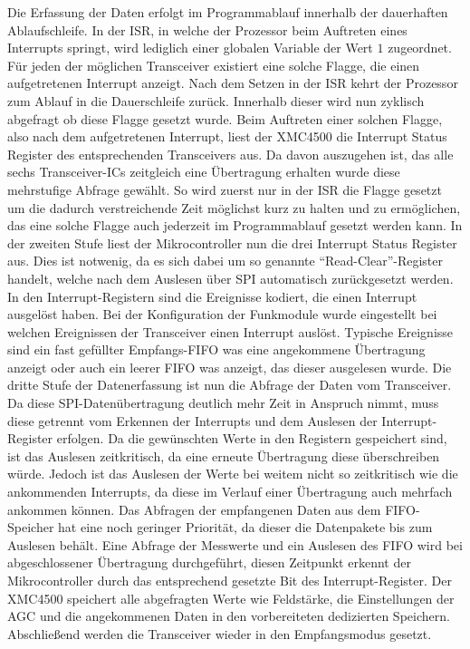 Die Erfassung der Daten erfolgt im Programmablauf innerhalb der dauerhaften Ablaufschleife.
In der \acf{ISR}, in welche der Prozessor beim Auftreten eines Interrupts springt, wird lediglich einer globalen Variable der Wert $1$ zugeordnet. Für jeden der möglichen Transceiver existiert eine solche Flagge, die einen aufgetretenen Interrupt anzeigt. Nach dem Setzen in der \ac{ISR} kehrt der Prozessor zum Ablauf in die Dauerschleife zurück. Innerhalb dieser wird nun zyklisch abgefragt ob diese Flagge gesetzt wurde. Beim Auftreten einer solchen Flagge, also nach dem aufgetretenen Interrupt, liest der XMC4500 die  Interrupt Status Register des entsprechenden Transceivers aus. 
Da davon auszugehen ist, das alle sechs Transceiver-\acp{IC} zeitgleich eine Übertragung erhalten wurde diese mehrstufige Abfrage gewählt. So wird zuerst nur in der \ac{ISR} die Flagge gesetzt um die dadurch verstreichende Zeit möglichst kurz zu halten und zu ermöglichen, das eine solche Flagge auch jederzeit im Programmablauf gesetzt werden kann. In der zweiten Stufe liest der Mikrocontroller nun die drei Interrupt Status Register aus. Dies ist notwenig, da es sich dabei um so genannte \enquote{Read-Clear}-Register handelt, welche  nach dem Auslesen über SPI automatisch zurückgesetzt werden.
In den Interrupt-Registern sind die Ereignisse kodiert, die einen Interrupt ausgelöst haben. Bei der Konfiguration der Funkmodule wurde eingestellt bei welchen Ereignissen der Transceiver einen Interrupt auslöst. Typische Ereignisse sind ein fast gefüllter Empfangs-\ac{FIFO} was eine angekommene Übertragung anzeigt oder auch ein leerer \ac{FIFO} was anzeigt, das dieser ausgelesen wurde. 
Die dritte Stufe  der Datenerfassung ist nun die Abfrage der Daten vom Transceiver. Da diese \ac{SPI}-Datenübertragung deutlich mehr Zeit in Anspruch nimmt, muss diese getrennt vom Erkennen der Interrupts und dem Auslesen der Interrupt-Register erfolgen. Da die gewünschten Werte in den Registern gespeichert sind, ist das Auslesen zeitkritisch, da eine erneute Übertragung diese überschreiben würde. Jedoch ist das Auslesen der Werte bei weitem nicht so zeitkritisch wie die ankommenden Interrupts, da diese im Verlauf einer Übertragung auch mehrfach ankommen können. Das Abfragen der empfangenen Daten aus dem \ac{FIFO}-Speicher hat eine noch geringer Priorität, da dieser die Datenpakete bis zum Auslesen behält. Eine Abfrage der Messwerte und ein Auslesen des \ac{FIFO} wird bei abgeschlossener Übertragung durchgeführt, diesen Zeitpunkt erkennt der Mikrocontroller durch das entsprechend gesetzte Bit des Interrupt-Register. Der XMC4500 speichert alle abgefragten Werte wie Feldstärke, die Einstellungen der \ac{AGC} und die angekommenen Daten in den vorbereiteten dedizierten Speichern. Abschließend werden die Transceiver wieder in den Empfangsmodus gesetzt. 


